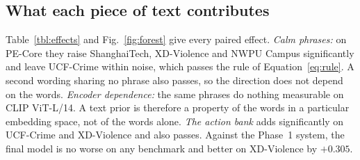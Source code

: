 \documentclass[conference,a4paper]{IEEEtran}
\begin{document}
\subsection{What each piece of text contributes}
\label{sec:p2-effects}
Table~\ref{tbl:effects} and Fig.~\ref{fig:forest} give every paired effect.
\emph{Calm phrases:} on PE-Core they raise ShanghaiTech, XD-Violence and NWPU
Campus significantly and leave UCF-Crime within noise, which passes the rule of
Equation~\eqref{eq:rule}. A second wording sharing no phrase also passes, so the
direction does not depend on the words. \emph{Encoder dependence:} the same
phrases do nothing measurable on CLIP ViT-L/14. A text prior is therefore a
property of the words in a particular embedding space, not of the words alone.
\emph{The action bank} adds significantly on UCF-Crime and XD-Violence and also
passes. Against the Phase~1 system, the final model is no worse on any
benchmark and better on XD-Violence by $+0.305$.
\end{document}
